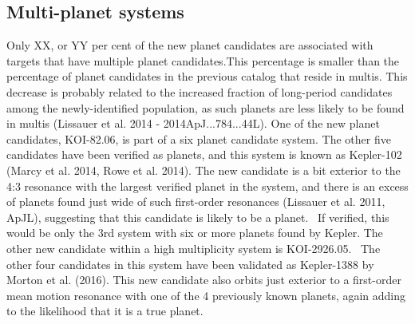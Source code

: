\subsection{Multi-planet systems}
Only XX, or YY per cent of the new planet candidates are associated with targets that have multiple planet candidates.This percentage is smaller than the percentage of planet candidates in the previous catalog that reside in multis.  This decrease is probably related to the increased fraction of long-period candidates among the newly-identified population, as such planets are less likely to be found in multis (Lissauer et al. 2014 - 2014ApJ...784...44L).
One of the new planet candidates, KOI-82.06, is part of a six planet candidate system. The other five candidates have been verified as planets, and this system is known as Kepler-102 (Marcy et al. 2014, Rowe et al. 2014). The new candidate is a bit exterior to the 4:3 resonance with the largest verified planet in the system, and there is an excess of planets found just wide of such first-order resonances (Lissauer et al. 2011, ApJL), suggesting that this candidate is likely to be a planet.  If verified, this would be only the 3rd system with six or more planets found by Kepler. 
The other new candidate within a high multiplicity system is KOI-2926.05.  The other four candidates in this system have been validated as Kepler-1388 by Morton et al. (2016). This new candidate also orbits just exterior to a first-order mean motion resonance with one of the 4 previously known planets, again adding to the likelihood that it is a true planet.  